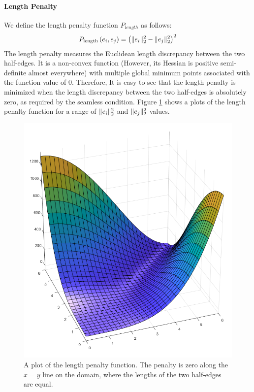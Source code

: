 \paragraph{Length Penalty}
We define the length penalty function $P_{length}$ as follows:
\begin{equation}\label{length_penalty}
\begin{split}
P_{\mathrm{length}}\left(e_i,e_j\right) = \left(\lVert e_i\rVert_2^2 - \lVert e_j\rVert_2^2\right)^2
\end{split}
\end{equation}
The length penalty measures the Euclidean length discrepancy between the two half-edges. It is a non-convex function (However, its Hessian is positive semi-definite almost everywhere) with multiple global minimum points associated with the function value of $0$. Therefore, It is easy to see that the length penalty is minimized when the length discrepancy between the two half-edges is absolutely zero, as required by the seamless condition. Figure \ref{fig:length_penalty} shows a plots of the length penalty function for a range of $\lVert e_i\rVert_2^2$ and $\lVert e_j\rVert_2^2$ values.
\begin{figure}[ht]
\centering
\includegraphics[width=12cm]{figures/seamless/length_penalty_function.png}
\caption[The Length Penalty Function]{A plot of the length penalty function. The penalty is zero along the $x=y$ line on the domain, where the lengths of the two half-edges are equal.}
\label{fig:length_penalty}
\end{figure}
